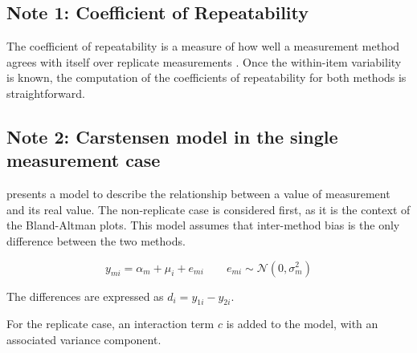 \documentclass[12pt, a4paper]{article}
\theoremstyle{plain}
\theoremstyle{definition}
\theoremstyle{remark}
\begin{document}
\subsection{Note 1: Coefficient of Repeatability}
The coefficient of repeatability is a measure of how well a
measurement method agrees with itself over replicate measurements
\citep{BA99}. Once the within-item variability is known, the
computation of the coefficients of repeatability for both methods
is straightforward.

\subsection{Note 2: Carstensen model in the single measurement case}
\citet{BXC2004} presents a model to describe the relationship between a value of measurement and its real value.
The non-replicate case is considered first, as it is the context of the Bland-Altman plots.
This model assumes that inter-method bias is the only difference between the two methods.


\begin{equation}
y_{mi}  = \alpha_{m} + \mu_{i} + e_{mi} \qquad  e_{mi} \sim \mathcal{N}(0,\sigma^{2}_{m})
\end{equation}

The differences are expressed as $d_{i} = y_{1i} - y_{2i}$.

For the replicate case, an interaction term $c$ is added to the model, with an associated variance component.
\end{document}
